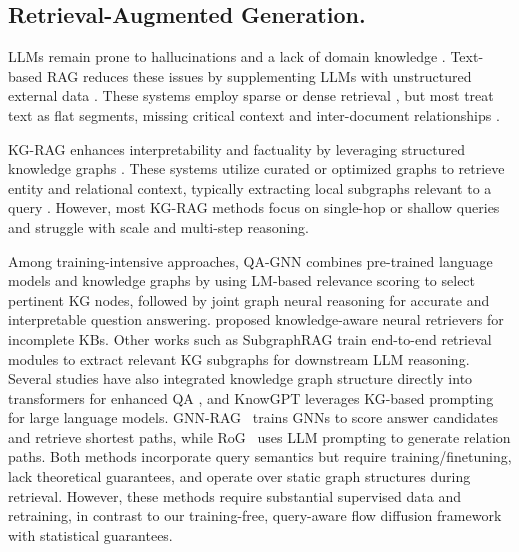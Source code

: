 \documentclass{article} %
\begin{document}
\subsection{Retrieval-Augmented Generation.}
LLMs remain prone to hallucinations and a lack of domain knowledge \citep{hallucination-survey,domain-knowledge-survey}. Text-based RAG reduces these issues by supplementing LLMs with unstructured external data \citep{lewis2020retrieval,guu2020retrieval}. These systems employ sparse or dense retrieval \citep{alon2022neuro,schick2023toolformer,jiang2023active,cheng2024lift,hofstatter2023fid,li2024llama2vec,zhang2024arl2}, but most treat text as flat segments, missing critical context and inter-document relationships \citep{edge2024graphrag,guo2024lightrag}.

KG-RAG enhances interpretability and factuality by leveraging structured knowledge graphs \citep{yasunaga2021kg-rag,gao2021kg-rag,li2024subgraphrag,he2025g}. These systems utilize curated \citep{wen2023mindmap,dehghan2024ewek} or optimized \citep{fang2024reano,panda2024holmes} graphs to retrieve entity and relational context, typically extracting local subgraphs relevant to a query \citep{bordes2015large,talmor2018web,gu2021beyond}. However, most KG-RAG methods focus on single-hop or shallow queries \citep{joshi2017triviaqa,yang2018hotpotqa,kwiatkowski2019natural,ho2020constructing} and struggle with scale and multi-step reasoning.

Among training-intensive approaches, QA-GNN \citep{yasunaga2021qagnn} combines pre-trained language models and knowledge graphs by using LM-based relevance scoring to select pertinent KG nodes, followed by joint graph neural reasoning for accurate and interpretable question answering. \citet{xiong2019improving} proposed knowledge-aware neural retrievers for incomplete KBs. Other works such as SubgraphRAG \citep{li2024subgraphrag} train end-to-end retrieval modules to extract relevant KG subgraphs for downstream LLM reasoning. Several studies have also integrated knowledge graph structure directly into transformers for enhanced QA \citep{hu2022oreo}, and KnowGPT \citep{zhang2023knowgpt} leverages KG-based prompting for large language models. {GNN-RAG~\citep{mavromatis2024gnn} trains GNNs to score answer candidates and retrieve shortest paths, while RoG~\citep{luo2024reasoning} uses LLM prompting to generate relation paths. Both methods incorporate query semantics but require training/finetuning, lack theoretical guarantees, and operate over static graph structures during retrieval.} However, these methods require substantial supervised data and retraining, in contrast to our training-free, query-aware flow diffusion framework with statistical guarantees.
\end{document}
